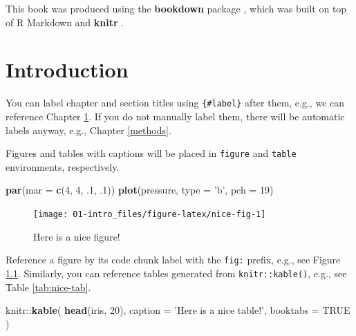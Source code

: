\documentclass[]{book}
\newenvironment{Shaded}{\begin{snugshade}}{\end{snugshade}}
\newcommand{\KeywordTok}[1]{\textcolor[rgb]{0.13,0.29,0.53}{\textbf{{#1}}}}
\newcommand{\DataTypeTok}[1]{\textcolor[rgb]{0.13,0.29,0.53}{{#1}}}
\newcommand{\DecValTok}[1]{\textcolor[rgb]{0.00,0.00,0.81}{{#1}}}
\newcommand{\StringTok}[1]{\textcolor[rgb]{0.31,0.60,0.02}{{#1}}}
\newcommand{\OtherTok}[1]{\textcolor[rgb]{0.56,0.35,0.01}{{#1}}}
\newcommand{\NormalTok}[1]{{#1}}
\theoremstyle{definition}
\theoremstyle{definition}
\theoremstyle{definition}
\theoremstyle{remark}
\begin{document}
This book was produced using the \textbf{bookdown} package
\citep{R-bookdown}, which was built on top of R Markdown and
\textbf{knitr} \citep{xie2015}.

\chapter{Introduction}\label{intro}

You can label chapter and section titles using \texttt{\{\#label\}}
after them, e.g., we can reference Chapter \ref{intro}. If you do not
manually label them, there will be automatic labels anyway, e.g.,
Chapter \ref{methods}.

Figures and tables with captions will be placed in \texttt{figure} and
\texttt{table} environments, respectively.

\begin{Shaded}
\begin{Highlighting}[]
\KeywordTok{par}\NormalTok{(}\DataTypeTok{mar =} \KeywordTok{c}\NormalTok{(}\DecValTok{4}\NormalTok{, }\DecValTok{4}\NormalTok{, .}\DecValTok{1}\NormalTok{, .}\DecValTok{1}\NormalTok{))}
\KeywordTok{plot}\NormalTok{(pressure, }\DataTypeTok{type =} \StringTok{'b'}\NormalTok{, }\DataTypeTok{pch =} \DecValTok{19}\NormalTok{)}
\end{Highlighting}
\end{Shaded}

\begin{figure}

{\centering \texttt{[image: 01-intro\_files/figure-latex/nice-fig-1]} 

}

\caption{Here is a nice figure!}\label{fig:nice-fig}
\end{figure}

Reference a figure by its code chunk label with the \texttt{fig:}
prefix, e.g., see Figure \ref{fig:nice-fig}. Similarly, you can
reference tables generated from \texttt{knitr::kable()}, e.g., see Table
\ref{tab:nice-tab}.

\begin{Shaded}
\begin{Highlighting}[]
\NormalTok{knitr::}\KeywordTok{kable}\NormalTok{(}
  \KeywordTok{head}\NormalTok{(iris, }\DecValTok{20}\NormalTok{), }\DataTypeTok{caption =} \StringTok{'Here is a nice table!'}\NormalTok{,}
  \DataTypeTok{booktabs =} \OtherTok{TRUE}
\NormalTok{)}
\end{Highlighting}
\end{Shaded}
\end{document}
